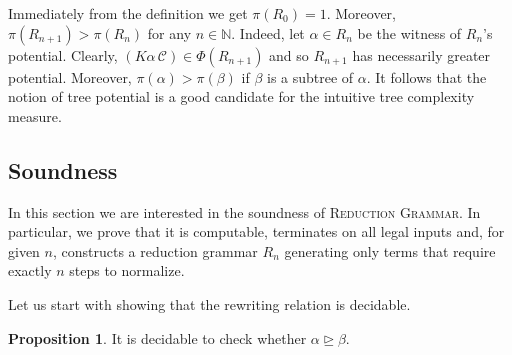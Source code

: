\documentclass[11pt,a4paper]{amsart}
\theoremstyle{definition}
\newtheorem{prop}[theorem]{Proposition}
\newcommand{\potential}[1]{\pi(#1)}
\begin{document}
Immediately from the definition we get $\potential{R_0} =
1$. Moreover, $\potential{R_{n+1}} > \potential{R_n}$ for any $n \in \mathbb{N}$.  Indeed, let $\alpha \in R_n$ be the witness of $R_n$'s potential. Clearly, $(K \alpha\, \mathcal{C}) \in \Phi(R_{n+1})$ and so $R_{n+1}$ has necessarily greater potential. Moreover, $\potential{\alpha} > \potential{\beta}$ if $\beta$ is a subtree of $\alpha$. It follows that the notion of tree potential is a good candidate for the intuitive tree complexity measure.

\subsection{Soundness}\label{sec:soundness}

In this section we are interested in the soundness of \textsc{Reduction Grammar}. In particular, we prove that it is computable, terminates on all legal inputs and, for given $n$, constructs a reduction grammar $R_n$ generating only terms that require exactly $n$ steps to normalize.

Let us start with showing that the rewriting relation is decidable.

\begin{prop}
    It is decidable to check whether $\alpha \trianglerighteq \beta$.
\end{prop}
\end{document}
